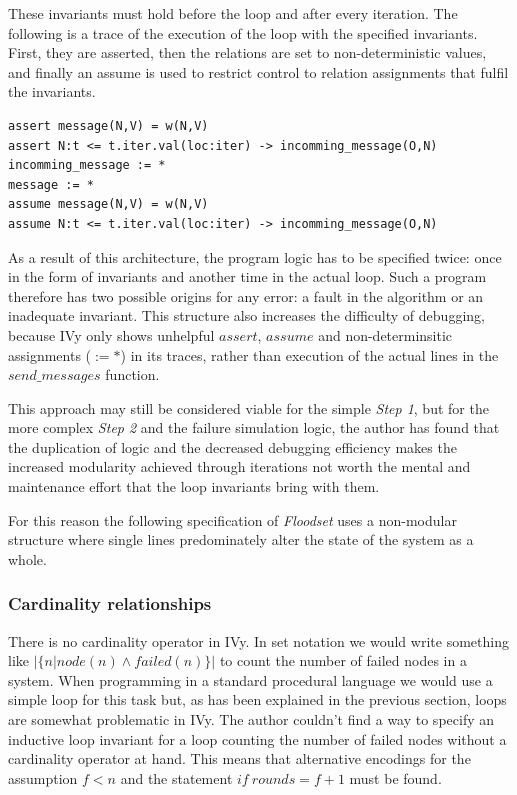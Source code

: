 \documentclass[fleqn]{article}
\begin{document}
These invariants must hold before the loop and after every iteration. The following is a trace of the execution of the loop with the specified invariants. First, they are asserted, then the relations are set to non-deterministic values, and finally an assume is used to restrict control to relation assignments that fulfil the invariants.

\begin{mdframed}[backgroundcolor=light-gray, roundcorner=10pt,leftmargin=1, rightmargin=1, innerleftmargin=15, innertopmargin=15,innerbottommargin=15, outerlinewidth=1, linecolor=light-gray]
\begin{lstlisting}
assert message(N,V) = w(N,V)
assert N:t <= t.iter.val(loc:iter) -> incomming_message(O,N)
incomming_message := *
message := *
assume message(N,V) = w(N,V)
assume N:t <= t.iter.val(loc:iter) -> incomming_message(O,N)
\end{lstlisting}
\end{mdframed}

As a result of this architecture, the program logic has to be specified twice: once in the form of invariants and another time in the actual loop. Such a program therefore has two possible origins for any error: a fault in the algorithm or an inadequate invariant. This structure also increases the difficulty of debugging, because IVy only shows unhelpful $assert$, $assume$ and  non-determinsitic assignments ($:= *$) in its traces, rather than execution of the actual lines in the $send\_messages$ function.

This approach may still be considered viable for the simple \textit{Step 1}, but for the more complex \textit{Step 2} and the failure simulation logic, the author has found that the duplication of logic and the decreased debugging efficiency makes the increased modularity achieved through iterations not worth the mental and maintenance effort that the loop invariants bring with them.

For this reason the following specification of \textit{Floodset} uses a non-modular structure where single lines predominately alter the state of the system as a whole.


\subsubsection{Cardinality relationships}
There is no cardinality operator in IVy. In set notation we would write something like $|\{n|node(n) \land failed(n)\}|$ to count the number of failed nodes in a system. When programming in a standard procedural language we would use a simple loop for this task but, as has been explained in the previous section, loops are somewhat problematic in IVy. The author couldn't find a way to specify an inductive loop invariant for a loop counting the number of failed nodes without a cardinality operator at hand. This means that alternative encodings for the assumption $f<n$ and the statement $if\ rounds = f+1$ must be found.
\end{document}
